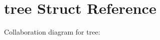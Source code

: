 \hypertarget{structtree}{}\section{tree Struct Reference}
\label{structtree}


Collaboration diagram for tree\+:
